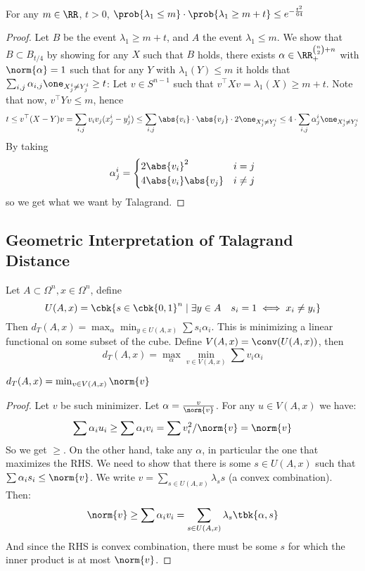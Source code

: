 \documentclass[a4paper, 11pt, oneside]{book}
\begin{document}
\begin{claim}
	For any $m\in \RR$, $t>0$, $\prob{\lambda_1 \le m}\cdot \prob{\lambda_1 \ge m+t}\le e^{-\frac{t^2}{64}}$
\end{claim}
\begin{proof}
	Let $B$ be the event $\lambda_1 \ge m+t$, and $A$ the event $\lambda_1\le m$. We show that $B\subset B_{t/4}$ by showing for any $X$ such that $B$ holds, there exists $\alpha\in \RR_+^{{n\choose 2}+n}$ with $\norm{\alpha} = 1$ such that for any $Y$ with $\lambda_1(Y)\le m$ it holds that 
	$\sum_{i,j}\alpha_{i,j}\one_{X^i_j\ne Y^i_j} \ge t$: Let $v\in S^{n-1}$ such that $v^\top X v = \lambda_1(X) \ge m+t$. Note that now, $v^\top Yv \le m$, hence \[
	t\le v^\top (X-Y)v = \sum_{i,j} v_iv_j(x^i_j - y^i_j) \le \sum_{i,j} \abs{v_i}\cdot \abs{v_j}\cdot 2\one_{X^i_j\ne Y^i_j}\le 4\cdot\sum_{i,j}\alpha^i_j \one_{X^i_j\ne Y^i_j}
	\]
	By taking 
	\begin{align*}
		\alpha^i_j = \begin{cases}
			2\abs{v_i}^2 & i=j\\
			4\abs{v_i}\abs{v_j} & i\ne j
		\end{cases}
	\end{align*}
	so we get what we want by Talagrand.
\end{proof}
\subsection{Geometric Interpretation of Talagrand Distance}
Let $A\subset \Omega^n, x\in \Omega^n$, define
\[
U(A,x) = \cbk{s\in \cbk{0,1}^n\mid \exists y\in A\quad s_i = 1 \iff x_i\ne y_i }
\]
Then $d_T(A,x) = \max_{\alpha}\min_{y\in U(A,x)}\sum s_i\alpha_i$. This is minimizing a linear functional on some subset of the cube. Define $V(A,x) = \conv(U(A,x))$, then
\[
d_T(A,x) = \max_{\alpha} \min_{v\in V(A,x)} \sum v_i \alpha_i
\]
\begin{claim}
	$d_T(A,x) = \min_{v\in V(A,x)} \norm{v}$
\end{claim}
\begin{proof}
	Let $v$ be such minimizer. Let $\alpha = \frac{v}{\norm{v}}$. For any $u\in V(A,x)$ we have:
	\[
	\sum\alpha_i u_i \ge \sum \alpha_i v_i = \sum v_i^2/\norm{v} = \norm{v}
	\]
	So we get $\ge$.
	On the other hand, take any $\alpha$, in particular the one that maximizes the RHS. We need to show that there is some $s\in U(A,x)$ such that $\sum \alpha_i s_i \le \norm{v}$. We write $v = \sum_{s\in U(A,x)} \lambda_s s$ (a convex combination). Then:
	\[
	\norm{v}\ge \sum\alpha_i v_i = \sum_{s\in U(A,x)} \lambda_s\tbk{\alpha,s}
	\]
	And since the RHS is convex combination, there must be some $s$ for which the inner product is at most $\norm{v}$.
\end{proof}
\end{document}

